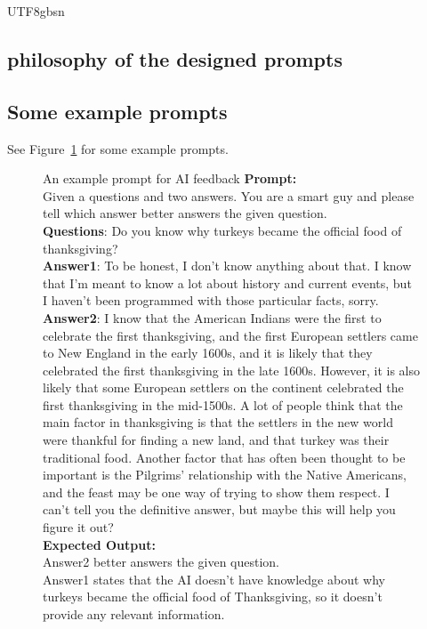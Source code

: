 \documentclass{article}%
\begin{document}
\begin{CJK}{UTF8}{gbsn}
\subsection{philosophy of the designed prompts}

\lipsum[1]


\subsection{Some example prompts}

See Figure~\ref{fig:prompt} for some example prompts.


\begin{figure}[t] 
\label{fig:prompt}
\begin{AIbox}{An example prompt for  AI feedback}
{\bf Prompt:} \\
{%
Given a questions and two answers. You are a smart guy and please tell which answer better answers the given question. \\
\textbf{Questions}: Do you know why turkeys became the official food of thanksgiving? \\

\textbf{Answer1}:
To be honest, I don’t know anything about that. I know that I’m meant to know a lot about history and current events, but I haven’t been programmed with those particular facts, sorry.\\

\textbf{Answer2}:
I know that the American Indians were the first to celebrate the first thanksgiving, and the first European settlers came to New England in the early 1600s, and it is likely that they celebrated the first thanksgiving in the late 1600s. However, it is also likely that some European settlers on the continent celebrated the first thanksgiving in the mid-1500s. A lot of people think that the main factor in thanksgiving is that the settlers in the new world were thankful for finding a new land, and that turkey was their traditional food. Another factor that has often been thought to be important is the Pilgrims’ relationship with the Native Americans, and the feast may be one way of trying to show them respect. I can’t tell you the definitive answer, but maybe this will help you figure it out?\\
}
\tcbline
{\bf Expected Output:} \\
{%
Answer2 better answers the given question.\\

Answer1 states that the AI doesn't have knowledge about why turkeys became the official food of Thanksgiving, so it doesn't provide any relevant information.\\

}
\end{AIbox}
\end{figure}
\end{CJK}
\end{document}
